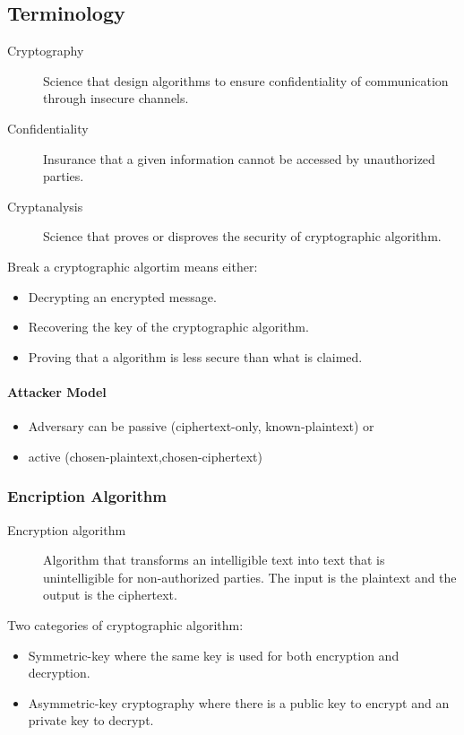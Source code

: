 \subsection{Terminology}
\begin{description}
    \item[Cryptography] Science that design algorithms to ensure confidentiality
    of communication through insecure channels.
    \item[Confidentiality] Insurance that a given information cannot be accessed
    by unauthorized parties.
    \item[Cryptanalysis] Science that proves or disproves the security of
    cryptographic algorithm.
\end{description}
Break a cryptographic algortim means either:
\begin{itemize}
    \item Decrypting an encrypted message.
    \item Recovering the key of the cryptographic algorithm.
    \item Proving that a algorithm is less secure than what is claimed.
\end{itemize}

\paragraph{Attacker Model}
\begin{itemize}
    \item Adversary can be passive (ciphertext-only, known-plaintext) or
    \item active (chosen-plaintext,chosen-ciphertext)
\end{itemize}

\subsubsection{Encription Algorithm}
\begin{description}
    \item[Encryption algorithm] Algorithm that transforms an intelligible text
    into text that is unintelligible for non-authorized parties. The input is
    the plaintext and the output is the ciphertext.
\end{description}
Two categories of cryptographic algorithm:
\begin{itemize}
    \item Symmetric-key where the same key is used for both encryption and
    decryption.
    \item Asymmetric-key cryptography where there is a public key to encrypt and
    an private key to decrypt.
\end{itemize}

